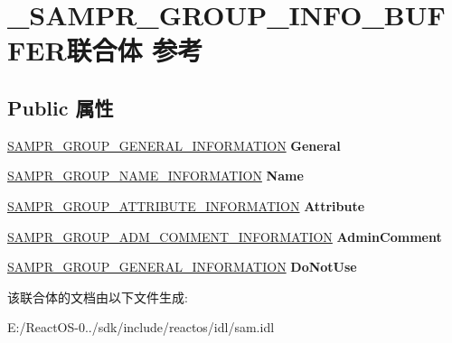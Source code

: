 \hypertarget{union___s_a_m_p_r___g_r_o_u_p___i_n_f_o___b_u_f_f_e_r}{}\section{\+\_\+\+S\+A\+M\+P\+R\+\_\+\+G\+R\+O\+U\+P\+\_\+\+I\+N\+F\+O\+\_\+\+B\+U\+F\+F\+E\+R联合体 参考}
\label{union___s_a_m_p_r___g_r_o_u_p___i_n_f_o___b_u_f_f_e_r}
\subsection*{Public 属性}
\begin{DoxyCompactItemize}
\item 
\mbox{\label{union___s_a_m_p_r___g_r_o_u_p___i_n_f_o___b_u_f_f_e_r_a812968ceed71f55d00eb4a3256bbe6eb}} 
\hyperlink{struct___s_a_m_p_r___g_r_o_u_p___g_e_n_e_r_a_l___i_n_f_o_r_m_a_t_i_o_n}{S\+A\+M\+P\+R\+\_\+\+G\+R\+O\+U\+P\+\_\+\+G\+E\+N\+E\+R\+A\+L\+\_\+\+I\+N\+F\+O\+R\+M\+A\+T\+I\+ON} {\bfseries General}
\item 
\mbox{\label{union___s_a_m_p_r___g_r_o_u_p___i_n_f_o___b_u_f_f_e_r_a97739a586ab3771bba36e80cb8ea8631}} 
\hyperlink{struct___s_a_m_p_r___g_r_o_u_p___n_a_m_e___i_n_f_o_r_m_a_t_i_o_n}{S\+A\+M\+P\+R\+\_\+\+G\+R\+O\+U\+P\+\_\+\+N\+A\+M\+E\+\_\+\+I\+N\+F\+O\+R\+M\+A\+T\+I\+ON} {\bfseries Name}
\item 
\mbox{\label{union___s_a_m_p_r___g_r_o_u_p___i_n_f_o___b_u_f_f_e_r_a4024f1abc2491048309480cef2d5f7ff}} 
\hyperlink{struct___s_a_m_p_r___g_r_o_u_p___a_t_t_r_i_b_u_t_e___i_n_f_o_r_m_a_t_i_o_n}{S\+A\+M\+P\+R\+\_\+\+G\+R\+O\+U\+P\+\_\+\+A\+T\+T\+R\+I\+B\+U\+T\+E\+\_\+\+I\+N\+F\+O\+R\+M\+A\+T\+I\+ON} {\bfseries Attribute}
\item 
\mbox{\label{union___s_a_m_p_r___g_r_o_u_p___i_n_f_o___b_u_f_f_e_r_a0d56051d86e9ff076f721f2cefe57723}} 
\hyperlink{struct___s_a_m_p_r___g_r_o_u_p___a_d_m___c_o_m_m_e_n_t___i_n_f_o_r_m_a_t_i_o_n}{S\+A\+M\+P\+R\+\_\+\+G\+R\+O\+U\+P\+\_\+\+A\+D\+M\+\_\+\+C\+O\+M\+M\+E\+N\+T\+\_\+\+I\+N\+F\+O\+R\+M\+A\+T\+I\+ON} {\bfseries Admin\+Comment}
\item 
\mbox{\label{union___s_a_m_p_r___g_r_o_u_p___i_n_f_o___b_u_f_f_e_r_abce174d9e9e403283e6ad937d26f0fc7}} 
\hyperlink{struct___s_a_m_p_r___g_r_o_u_p___g_e_n_e_r_a_l___i_n_f_o_r_m_a_t_i_o_n}{S\+A\+M\+P\+R\+\_\+\+G\+R\+O\+U\+P\+\_\+\+G\+E\+N\+E\+R\+A\+L\+\_\+\+I\+N\+F\+O\+R\+M\+A\+T\+I\+ON} {\bfseries Do\+Not\+Use}
\end{DoxyCompactItemize}


该联合体的文档由以下文件生成\+:\begin{DoxyCompactItemize}
\item 
E\+:/\+React\+O\+S-\/0../sdk/include/reactos/idl/sam.\+idl\end{DoxyCompactItemize}
